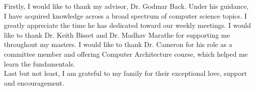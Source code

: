 Firstly, I would like to thank my advisor, Dr. Godmar Back. Under his guidance, I have acquired knowledge across a broad spectrum of computer science topics. I greatly appreciate the time he has dedicated toward our weekly meetings. I would like to thank Dr. Keith Bisset and Dr. Madhav Marathe for supporting me throughout my masters. I would like to thank Dr. Cameron for his role as a committee member and offering Computer Architecture course, which helped me learn the fundamentals.
\\
Last but not least, I am grateful to my family for their exceptional love, support and encouragement.  
